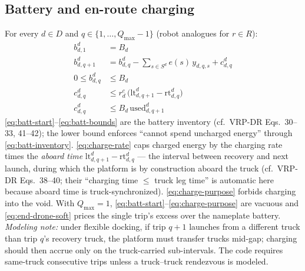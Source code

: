 \documentclass[10pt]{article}
\begin{document}
\subsection{Battery and en-route charging}
\label{sec:charging}
For every $d\in D$ and $q \in \{1,\dots,Q_{\max}-1\}$ (robot analogues for
$r\in R$):
\begin{align}
b^d_{d,1} &= B_d \label{eq:batt-start}\\
b^d_{d,q+1} &= b^d_{d,q} - \sum_{s\in S^d} e(s)\,y_{d,q,s} + c^d_{d,q} \label{eq:batt-inventory}\\
0 \le b^d_{d,q} &\le B_d \label{eq:batt-bounds}\\
c^d_{d,q} &\le r^c_d\,\big(\mathrm{lt}^d_{d,q+1} - \mathrm{rt}^d_{d,q}\big) \label{eq:charge-rate}\\
c^d_{d,q} &\le B_d\,\mathrm{used}^d_{d,q+1} \label{eq:charge-purpose}
\end{align}
\noindent \eqref{eq:batt-start}--\eqref{eq:batt-bounds} are the battery
inventory (cf.\ VRP-DR Eqs.~30--33, 41--42); the lower bound enforces ``cannot
spend uncharged energy'' through \eqref{eq:batt-inventory}.
\eqref{eq:charge-rate} caps charged energy by the charging rate times the
\emph{aboard time} $\mathrm{lt}^d_{d,q+1} - \mathrm{rt}^d_{d,q}$ --- the
interval between recovery and next launch, during which the platform is by
construction aboard the truck (cf.\ VRP-DR Eqs.~38--40; their ``charging time
$\le$ truck leg time'' is automatic here because aboard time is
truck-synchronized). \eqref{eq:charge-purpose} forbids charging into the void.
With $Q_{\max}=1$, \eqref{eq:batt-start}--\eqref{eq:charge-purpose} are vacuous
and \eqref{eq:end-drone-soft} prices the single trip's excess over the
nameplate battery. \emph{Modeling note:} under flexible docking, if
trip $q+1$ launches from a different truck than trip $q$'s recovery truck, the
platform must transfer trucks mid-gap; charging should then accrue only on the
truck-carried sub-intervals. The code requires same-truck consecutive trips
unless a truck--truck rendezvous is modeled.
\end{document}
